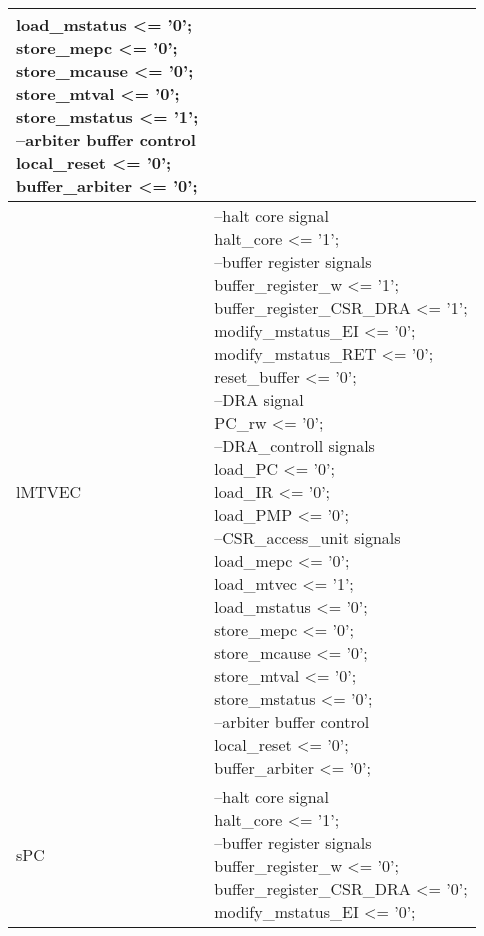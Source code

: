 \begin{small}
\begin{longtable}{| p{} | p{} |}
{		load\_mstatus <= '0';\\
		store\_mepc <= '0';\\
		store\_mcause <= '0';\\
		store\_mtval <= '0';\\
		store\_mstatus <= '1';\\
		--arbiter buffer control\\
		local\_reset <= '0';\\
		buffer\_arbiter <= '0';} \\
	\hline
	lMTVEC & \makecell{--halt core signal\\
		halt\_core <= '1';\\
		--buffer register signals\\
		buffer\_register\_w <= '1';\\
		buffer\_register\_CSR\_DRA <= '1';\\
		modify\_mstatus\_EI <= '0';\\
		modify\_mstatus\_RET <= '0';\\
		reset\_buffer <= '0';\\
		--DRA signal\\
		PC\_rw <= '0';\\
		--DRA\_controll signals\\
		load\_PC <= '0';\\
		load\_IR <= '0';\\
		load\_PMP <= '0';\\
		--CSR\_access\_unit signals\\
		load\_mepc <= '0';\\
		load\_mtvec <= '1';\\
		load\_mstatus <= '0';\\
		store\_mepc <= '0';\\
		store\_mcause <= '0';\\
		store\_mtval <= '0';\\
		store\_mstatus <= '0';\\
		--arbiter buffer control\\
		local\_reset <= '0';\\
		buffer\_arbiter <= '0';} \\
	\hline
	sPC & \makecell{--halt core signal\\
		halt\_core <= '1';\\
		--buffer register signals\\
		buffer\_register\_w <= '0';\\
		buffer\_register\_CSR\_DRA <= '0';\\
		modify\_mstatus\_EI <= '0';\\
}
\end{longtable}
\end{small}
